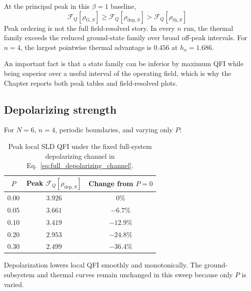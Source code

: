 At the principal peak in this $\beta=1$ baseline,
\[
    \mathcal{F}_Q[\rho_{\mathrm{G},S}]\geq
    \mathcal{F}_Q[\rho_{\mathrm{dep},S}]>
    \mathcal{F}_Q[\rho_{\mathrm{th},S}]
\]
Peak ordering is not the full field-resolved story.  In every $n$ run, the thermal family exceeds the reduced ground-state family over broad off-peak intervals. For $n=4$, the largest pointwise thermal advantage is $0.456$ at $h_x=1.686$.

\faLightbulb \hspace{5pt} An important fact is that a state family can be inferior by maximum QFI while being superior over a useful interval of the operating field, which is why the Chapter reports both peak tables and field-resolved plots.



\subsection{Depolarizing strength}

For $N=6$, $n=4$, periodic boundaries, and varying only $P$:
\begin{table}[htbp]
    \centering
    \caption{Peak local SLD QFI under the fixed full-system depolarizing channel in Eq.~\eqref{eq:full_depolarizing_channel}.}
    \label{tab:project9_preset_d}
    \begin{tabular}{c c c}
        \toprule
        $P$    & Peak $\mathcal{F}_Q[\rho_{\mathrm{dep},S}]$ & Change from $P=0$ \\
        \midrule
        $0.00$ & $3.926$                                     & $0\%$             \\
        $0.05$ & $3.661$                                     & $-6.7\%$          \\
        $0.10$ & $3.419$                                     & $-12.9\%$         \\
        $0.20$ & $2.953$                                     & $-24.8\%$         \\
        $0.30$ & $2.499$                                     & $-36.4\%$         \\
        \bottomrule
    \end{tabular}
\end{table}

Depolarization lowers local QFI smoothly and monotonically.  The ground-subsystem and thermal curves remain unchanged in this sweep because only $P$ is varied.

